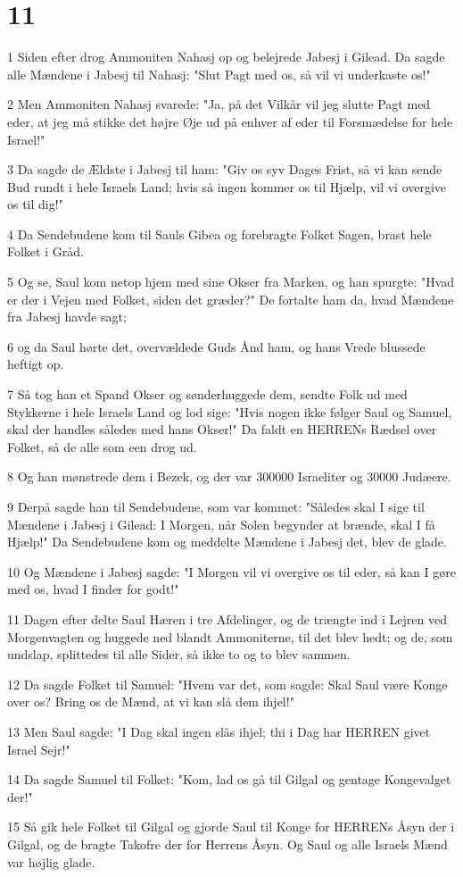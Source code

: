 \chapter{11}

\par 1 Siden efter drog Ammoniten Nahasj op og belejrede Jabesj i Gilead. Da sagde alle Mændene i Jabesj til Nahasj: "Slut Pagt med os, så vil vi underkaste os!"
\par 2 Men Ammoniten Nahasj svarede: "Ja, på det Vilkår vil jeg slutte Pagt med eder, at jeg må stikke det højre Øje ud på enhver af eder til Forsmædelse for hele Israel!"
\par 3 Da sagde de Ældste i Jabesj til ham: "Giv os syv Dages Frist, så vi kan sende Bud rundt i hele Israels Land; hvis så ingen kommer os til Hjælp, vil vi overgive os til dig!"
\par 4 Da Sendebudene kom til Sauls Gibea og forebragte Folket Sagen, brast hele Folket i Gråd.
\par 5 Og se, Saul kom netop hjem med sine Okser fra Marken, og han spurgte: "Hvad er der i Vejen med Folket, siden det græder?" De fortalte ham da, hvad Mændene fra Jabesj havde sagt;
\par 6 og da Saul hørte det, overvældede Guds Ånd ham, og hans Vrede blussede heftigt op.
\par 7 Så tog han et Spand Okser og sønderhuggede dem, sendte Folk ud med Stykkerne i hele Israels Land og lod sige: "Hvis nogen ikke følger Saul og Samuel, skal der handles således med hans Okser!" Da faldt en HERRENs Rædsel over Folket, så de alle som een drog ud.
\par 8 Og han mønstrede dem i Bezek, og der var 300000 Israeliter og 30000 Judæere.
\par 9 Derpå sagde han til Sendebudene, som var kommet: "Således skal I sige til Mændene i Jabesj i Gilead: I Morgen, når Solen begynder at brænde, skal I få Hjælp!" Da Sendebudene kom og meddelte Mændene i Jabesj det, blev de glade.
\par 10 Og Mændene i Jabesj sagde: "I Morgen vil vi overgive os til eder, så kan I gøre med os, hvad I finder for godt!"
\par 11 Dagen efter delte Saul Hæren i tre Afdelinger, og de trængte ind i Lejren ved Morgenvagten og huggede ned blandt Ammoniterne, til det blev hedt; og de, som undslap, splittedes til alle Sider, så ikke to og to blev sammen.
\par 12 Da sagde Folket til Samuel: "Hvem var det, som sagde: Skal Saul være Konge over os? Bring os de Mænd, at vi kan slå dem ihjel!"
\par 13 Men Saul sagde: "I Dag skal ingen slås ihjel; thi i Dag har HERREN givet Israel Sejr!"
\par 14 Da sagde Samuel til Folket: "Kom, lad os gå til Gilgal og gentage Kongevalget der!"
\par 15 Så gik hele Folket til Gilgal og gjorde Saul til Konge for HERRENs Åsyn der i Gilgal, og de bragte Takofre der for Herrens Åsyn. Og Saul og alle Israels Mænd var højlig glade.


